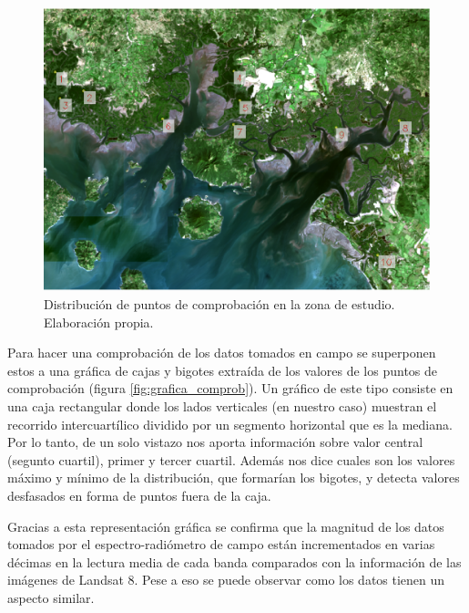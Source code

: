 \begin{figure}
	\centering
	\includegraphics[width=0.8\linewidth]{./Imagenes/puntos_comprob.eps}
	\caption[Distribución de puntos]{Distribución de puntos de comprobación en la zona de estudio. Elaboración propia.}
	\label{fig:dist_puntos}
\end{figure}

Para hacer una comprobación de los datos tomados en campo se superponen estos a una gráfica de cajas y bigotes extraída de los valores de los puntos de comprobación (figura \ref{fig:grafica_comprob}). Un gráfico de este tipo consiste en una caja rectangular donde los lados verticales (en nuestro caso) muestran el recorrido intercuartílico dividido por un segmento horizontal que es la mediana. Por lo tanto, de un solo vistazo nos aporta información sobre valor central (segunto cuartil), primer y tercer cuartil. Además nos dice cuales son los valores máximo y mínimo de la distribución, que formarían los bigotes, y detecta valores desfasados en forma de puntos fuera de la caja.%

Gracias a esta representación gráfica se confirma que la magnitud de los datos tomados por el espectro-radiómetro de campo están incrementados en varias décimas en la lectura media de cada banda comparados con la información de las imágenes de Landsat 8. Pese a eso se puede observar como los datos tienen un aspecto similar.


